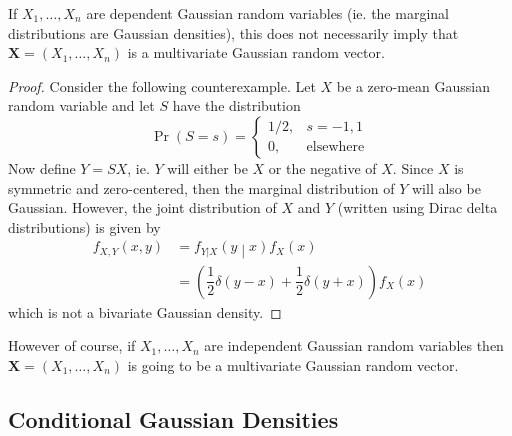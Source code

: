\documentclass[11pt]{report} %
\begin{document}
If $X_{1}, \dots, X_{n}$ are dependent Gaussian random variables (ie. the marginal distributions are Gaussian densities), this does not necessarily imply that $\mathbf{X} = \left(X_{1}, \dots, X_{n}\right)$ is a multivariate Gaussian random vector.
\begin{proof}
Consider the following counterexample. Let $X$ be a zero-mean Gaussian random variable and let $S$ have the distribution
\begin{equation}
\operatorname{Pr}\left(S = s\right) = \begin{cases} 1/2, & s = -1, 1 \\ 0, & \mathrm{elsewhere} \end{cases}
\end{equation}
Now define $Y = SX$, ie. $Y$ will either be $X$ or the negative of $X$. Since $X$ is symmetric and zero-centered, then the marginal distribution of $Y$ will also be Gaussian. However, the joint distribution of $X$ and $Y$ (written using Dirac delta distributions) is given by
\begin{align}
f_{X, Y}\left(x, y\right) &= f_{Y|X}\left(y\middle| x\right)f_{X}\left(x\right) \\
&= \left(\dfrac{1}{2}\delta\left(y - x\right) + \dfrac{1}{2}\delta\left(y + x\right)\right)f_{X}\left(x\right)
\end{align}
which is not a bivariate Gaussian density.
\end{proof}
However of course, if $X_{1}, \dots, X_{n}$ are independent Gaussian random variables then $\mathbf{X} = \left(X_{1}, \dots, X_{n}\right)$ is going to be a multivariate Gaussian random vector.

\subsection{Conditional Gaussian Densities}
\end{document}

